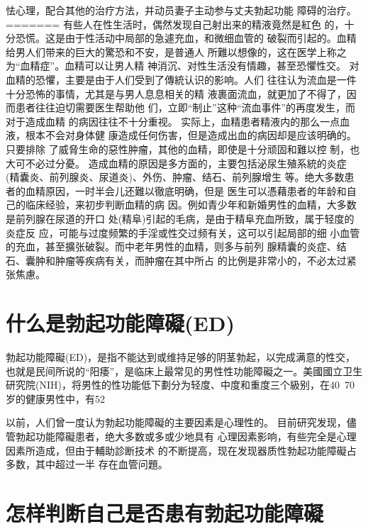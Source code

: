 \documentclass[12pt,UTF8]{ctexbook}
\begin{document}
怯心理，配合其他的治疗方法，并动员妻子主动参与丈夫勃起功能
障碍的治疗。
=======
有些人在性生活时，偶然发现自己射出来的精液竟然是紅色
的，十分恐慌。这是由于性活动中局部的急遽充血，和微细血管的
破裂而引起的。血精给男人们带来的巨大的驚恐和不安，是普通人
所難以想像的，这在医学上称之为“血精症”。血精可以让男人精
神消沉、对性生活没有情趣，甚至恐懼性交。
对血精的恐懼，主要是由于人们受到了傳統认识的影响。人们
往往认为流血是一件十分恐怖的事情，尤其是与男人息息相关的精
液裹面流血，就更加了不得了，因而患者往往迫切需要医生帮助他
们，立即“制止”这种“流血事件”的再度发生，而对于造成血精
的病因往往不十分重视。
实际上，血精患者精液内的那么一点血液，根本不会对身体健
康造成任何伤害，但是造成出血的病因却是应该明确的。只要排除
了威脅生命的惡性肿瘤，其他的血精，即使是十分顽固和難以控
制，也大可不必过分憂。
造成血精的原因是多方面的，主要包括泌尿生殖系統的炎症
(精囊炎、前列腺炎、尿道炎)、外伤、肿瘤、结石、前列腺增生
等。绝大多数患者的血精原因，一时半会儿还難以徹底明确，但是
医生可以憑藉患者的年龄和自己的临床经验，来初步判断血精的病
因。例如青少年和新婚男性的血精，大多数是前列腺在尿道的开口
处(精阜)引起的毛病，是由于精阜充血所致，属于轻度的炎症反
应，可能与过度频繁的手淫或性交过频有关，这可以引起局部的细
小血管的充血，甚至擴张破裂。而中老年男性的血精，则多与前列
腺精囊的炎症、结石、囊肿和肿瘤等疾病有关，而肿瘤在其中所占
的比例是非常小的，不必太过紧张焦慮。

\section{什么是勃起功能障礙(ED)}

勃起功能障礙(ED)，是指不能达到或维持足够的阴茎勃起，以完成满意的性交，也就是民间所说的“阳痿”，是临床上最常见的男性性功能障礙之一。美國國立卫生研究院(NIH)，将男性的性功能低下劃分为轻度、中度和重度三个級别，在40~70岁的健康男性中，有52%

以前，人们曾一度认为勃起功能障礙的主要因素是心理性的。
目前研究发现，儘管勃起功能障礙患者，绝大多数或多或少地具有
心理因素影响，有些完全是心理因素所造成，但由于輔助診断技术
的不断提高，现在发现器质性勃起功能障礙占多数，其中超过一半
存在血管问題。

\section{怎样判断自己是否患有勃起功能障礙}
\end{document}

